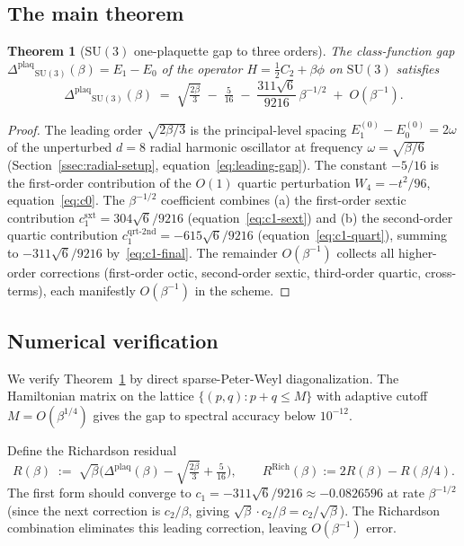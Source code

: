 \documentclass[11pt,a4paper]{article}
\newtheorem{theorem}{Theorem}[section]
\theoremstyle{definition}
\newcommand{\SU}{\mathrm{SU}}
\newcommand{\Cas}{C_2}
\newcommand{\Gap}{{\Delta^{\mathrm{plaq}}}}
\begin{document}
\subsection{The main theorem}

\begin{theorem}[$\SU(3)$ one-plaquette gap to three orders]
\label{thm:su3-asym}
The class-function gap $\Gap_{\SU(3)}(\beta) = E_1 - E_0$ of the
operator $H = \tfrac{1}{2}\Cas + \beta\phi$ on $\SU(3)$ satisfies
\[
\boxed{\;
\Gap_{\SU(3)}(\beta)
\;=\;
\sqrt{\tfrac{2\beta}{3}}
\;-\;\tfrac{5}{16}
\;-\;\frac{311\sqrt{6}}{9216}\,\beta^{-1/2}
\;+\;O(\beta^{-1}).
\;}
\]
\end{theorem}

\begin{proof}
The leading order $\sqrt{2\beta/3}$ is the principal-level spacing
$E_1^{(0)}-E_0^{(0)} = 2\omega$ of the unperturbed $d=8$ radial
harmonic oscillator at frequency $\omega = \sqrt{\beta/6}$
(Section~\ref{ssec:radial-setup}, equation~\eqref{eq:leading-gap}).
The constant $-5/16$ is the first-order contribution of the $O(1)$
quartic perturbation $W_4 = -t^2/96$, equation~\eqref{eq:c0}.
The $\beta^{-1/2}$ coefficient combines (a) the first-order sextic
contribution $c_1^{\mathrm{sxt}} = 304\sqrt{6}/9216$
(equation~\eqref{eq:c1-sext}) and (b) the second-order quartic
contribution $c_1^{\mathrm{qrt\text{-}2nd}} = -615\sqrt{6}/9216$
(equation~\eqref{eq:c1-quart}), summing to
$-311\sqrt{6}/9216$ by~\eqref{eq:c1-final}. The remainder $O(\beta^{-1})$
collects all higher-order corrections (first-order octic,
second-order sextic, third-order quartic, cross-terms), each
manifestly $O(\beta^{-1})$ in the scheme.
\end{proof}

\subsection{Numerical verification}\label{sec:numerical}

We verify Theorem~\ref{thm:su3-asym} by direct sparse-Peter-Weyl
diagonalization. The Hamiltonian matrix on the lattice
$\{(p,q): p+q \le M\}$ with adaptive cutoff $M = O(\beta^{1/4})$
gives the gap to spectral accuracy below $10^{-12}$.

Define the Richardson residual
\[
R(\beta)
\;:=\;
\sqrt\beta\Big(\Gap(\beta) - \sqrt{\tfrac{2\beta}{3}} + \tfrac{5}{16}\Big),
\qquad
R^{\mathrm{Rich}}(\beta) := 2R(\beta) - R(\beta/4).
\]
The first form should converge to $c_1 = -311\sqrt 6/9216 \approx
-0.0826596$ at rate $\beta^{-1/2}$ (since the next correction is
$c_2/\beta$, giving $\sqrt\beta\cdot c_2/\beta = c_2/\sqrt\beta$). The
Richardson combination eliminates this leading correction, leaving
$O(\beta^{-1})$ error.
\end{document}
